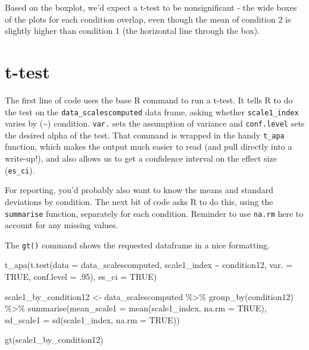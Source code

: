 \documentclass[
  letterpaper,
  DIV=11,
  numbers=noendperiod]{scrreprt}
\newenvironment{Shaded}{\begin{snugshade}}{\end{snugshade}}
\newcommand{\AttributeTok}[1]{\textcolor[rgb]{0.40,0.45,0.13}{#1}}
\newcommand{\ConstantTok}[1]{\textcolor[rgb]{0.56,0.35,0.01}{#1}}
\newcommand{\DecValTok}[1]{\textcolor[rgb]{0.68,0.00,0.00}{#1}}
\newcommand{\FunctionTok}[1]{\textcolor[rgb]{0.28,0.35,0.67}{#1}}
\newcommand{\NormalTok}[1]{\textcolor[rgb]{0.00,0.23,0.31}{#1}}
\newcommand{\OtherTok}[1]{\textcolor[rgb]{0.00,0.23,0.31}{#1}}
\newcommand{\SpecialCharTok}[1]{\textcolor[rgb]{0.37,0.37,0.37}{#1}}
\begin{document}
Based on the boxplot, we'd expect a t-test to be nonsignificant - the
wide boxes of the plots for each condition overlap, even though the mean
of condition 2 is slightly higher than condition 1 (the horizontal line
through the box).

\section{t-test}\label{t-test}

The first line of code uses the base R command to run a t-test. It tells
R to do the test on the \texttt{data\_scalescomputed} data frame, asking
whether \texttt{scale1\_index} varies by (\textasciitilde) condition.
\texttt{var.} sets the assumption of variance and \texttt{conf.level}
sets the desired alpha of the test. That command is wrapped in the handy
\texttt{t\_apa} function, which makes the output much easier to read
(and pull directly into a write-up!), and also allows us to get a
confidence interval on the effect size (\texttt{es\_ci}).

For reporting, you'd probably also want to know the means and standard
deviations by condition. The next bit of code asks R to do this, using
the \texttt{summarise} function, separately for each condition. Reminder
to use \texttt{na.rm} here to account for any missing values.

The \texttt{gt()} command shows the requested dataframe in a nice
formatting.

\begin{Shaded}
\begin{Highlighting}[]
\FunctionTok{t\_apa}\NormalTok{(}\FunctionTok{t.test}\NormalTok{(}\AttributeTok{data =}\NormalTok{ data\_scalescomputed, scale1\_index }\SpecialCharTok{\textasciitilde{}}\NormalTok{ condition12, }\AttributeTok{var. =} \ConstantTok{TRUE}\NormalTok{, }\AttributeTok{conf.level =}\NormalTok{ .}\DecValTok{95}\NormalTok{), }\AttributeTok{es\_ci =} \ConstantTok{TRUE}\NormalTok{)}


\NormalTok{scale1\_by\_condition12 }\OtherTok{\textless{}{-}}\NormalTok{ data\_scalescomputed }\SpecialCharTok{\%\textgreater{}\%}
  \FunctionTok{group\_by}\NormalTok{(condition12) }\SpecialCharTok{\%\textgreater{}\%}
  \FunctionTok{summarise}\NormalTok{(}\AttributeTok{mean\_scale1 =} \FunctionTok{mean}\NormalTok{(scale1\_index, }\AttributeTok{na.rm =} \ConstantTok{TRUE}\NormalTok{),}
            \AttributeTok{sd\_scale1 =} \FunctionTok{sd}\NormalTok{(scale1\_index, }\AttributeTok{na.rm =} \ConstantTok{TRUE}\NormalTok{))}


\FunctionTok{gt}\NormalTok{(scale1\_by\_condition12)}
\end{Highlighting}
\end{Shaded}
\end{document}
